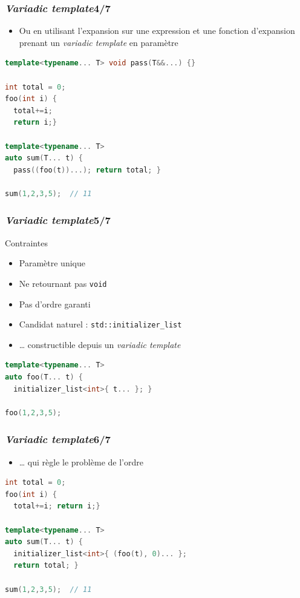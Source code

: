 \documentclass[C++.tex]{subfiles}
\begin{document}
\begin{frame}[fragile]
	\frametitle{\textit{Variadic template}\titlehfill{}4/7}
	\begin{itemize}
		\item Ou en utilisant l'expansion sur une expression et une fonction d'expansion prenant un \textit{variadic template} en paramètre
	\end{itemize}

	\begin{lstlisting}[language=C++]
template<typename... T> void pass(T&&...) {}

int total = 0;
foo(int i) {
  total+=i; 
  return i;}

template<typename... T>
auto sum(T... t) {
  pass((foo(t))...); return total; }

sum(1,2,3,5);  // 11\end{lstlisting}
\end{frame}

\begin{frame}[fragile]
	\frametitle{\textit{Variadic template}\titlehfill{}5/7}
	\begin{alertblock}{Contraintes}
		\begin{itemize}
			\item Paramètre unique
			\item Ne retournant pas \lstinline|void|
			\item Pas d'ordre garanti
		\end{itemize}
	\end{alertblock}

	\begin{itemize}
		\item Candidat naturel : \lstinline|std::initializer_list|
		\item \ldots{} constructible depuis un\textit{ variadic template}
	\end{itemize}

	\begin{lstlisting}[language=C++]
template<typename... T>
auto foo(T... t) {
  initializer_list<int>{ t... }; }

foo(1,2,3,5);\end{lstlisting}
\end{frame}

\begin{frame}[fragile]
	\frametitle{\textit{Variadic template}\titlehfill{}6/7}
	\begin{itemize}
		\item \ldots{} qui règle le problème de l'ordre
	\end{itemize}

	\begin{lstlisting}[language=C++]
int total = 0;
foo(int i) {
  total+=i; return i;}

template<typename... T>
auto sum(T... t) {
  initializer_list<int>{ (foo(t), 0)... };
  return total; }

sum(1,2,3,5);  // 11\end{lstlisting}

\end{frame}
\end{document}
